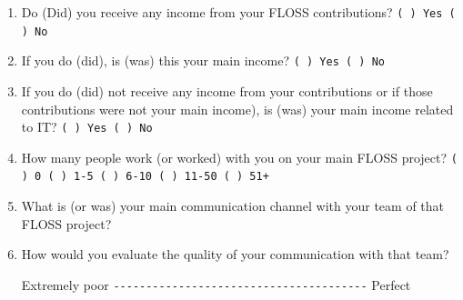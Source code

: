 \documentclass[lnbip]{svmultln}
\begin{document}
\begin{enumerate}
\item Do (Did) you receive any income from your FLOSS contributions?
  \verb=( ) Yes ( ) No= \vspace{10pt}

\item If you do (did), is (was) this your main income?
  \verb=( ) Yes ( ) No= \vspace{10pt}

\item If you do (did) not receive any income from your contributions
  or if those contributions were not your main income), is (was) your
  main income related to IT?  \verb=( ) Yes ( ) No= \vspace{10pt}

\item How many people work (or worked) with you on your main FLOSS
  project?  \verb=( ) 0 ( ) 1-5 ( ) 6-10 ( ) 11-50 ( ) 51+=
  \vspace{10pt}

\item What is (or was) your main communication channel with your team
  of that FLOSS project?
  \vspace{10pt}

\item How would you evaluate the quality of your communication with
  that team?

  Extremely poor \verb=---------------------------------------=
  Perfect \vspace{10pt}


\end{enumerate}
\end{document}
